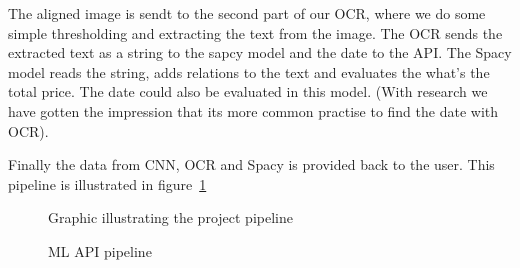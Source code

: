 The aligned image is sendt to the second part of our OCR, where we do some simple thresholding and extracting the text from the image.
The OCR sends the extracted text as a string to the sapcy model and the date to the API\@.
The Spacy model reads the string, adds relations to the text and evaluates the what's the total price.
The date could also be evaluated in this model. (With research we have gotten the impression that its more common practise to find the date with OCR).

Finally the data from CNN, OCR and Spacy is provided back to the user.
This pipeline is illustrated in figure~\ref{fig:pipeline}

\begin{figure}[h]
    \caption{Graphic illustrating the project pipeline}
    \label{fig:pipeline}
\end{figure}

\begin{figure}[h]
    \caption{ML API pipeline}
    \label{fig:ML API}
\end{figure}

